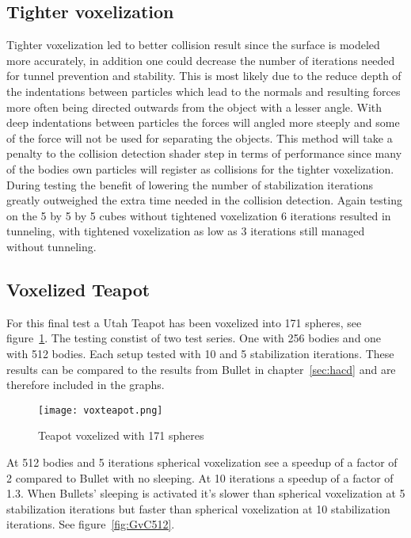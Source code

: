 \subsection{Tighter voxelization}
Tighter voxelization led to better collision result since the surface is modeled
more accurately, in addition one could decrease the number of iterations needed
for tunnel prevention and stability. This is most likely due to the reduce depth
of the indentations between particles which lead to the normals and resulting forces more often
being directed outwards from the object with a lesser angle.
 With deep indentations between particles the forces will angled more steeply and
  some of the force will not be used for separating the objects.
This method will take a penalty to the collision detection shader step in
terms of performance since many of the bodies own particles will register as collisions
for the tighter voxelization. During testing the benefit of lowering the number of
stabilization iterations greatly outweighed the extra time needed in the collision
detection. Again testing on the 5 by 5 by 5 cubes without tightened voxelization 6 iterations resulted in
tunneling, with tightened voxelization as low as 3 iterations still managed without tunneling.

\subsection{Voxelized Teapot}\label{sec:teapot}
For this final test a Utah Teapot has been voxelized into 171 spheres, see figure~\ref{fig:voxteapot}.
The testing constist of two test series. One with 256 bodies and one with 512 bodies.
Each setup tested with 10 and 5 stabilization iterations. These results can be compared to the
results from Bullet in chapter~\ref{sec:hacd} and are therefore included in the graphs.

\begin{figure}[H]
  \centering
  \texttt{[image: voxteapot.png]}
  \caption{Teapot voxelized with 171 spheres}
  \label{fig:voxteapot}
\end{figure}


At 512 bodies and 5 iterations spherical voxelization see a speedup of a factor of 2 compared to
Bullet with no sleeping. At 10 iterations a speedup of a factor of 1.3.
When Bullets' sleeping is activated it's slower than spherical voxelization at 5 stabilization iterations but faster than
spherical voxelization at 10 stabilization iterations. See figure~\ref{fig:GvC512}.

